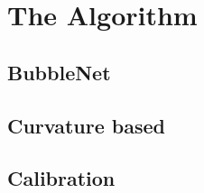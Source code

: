 \chapter{The Algorithm} \label{the_algorithm}
	\section{BubbleNet}
	\section{Curvature based}
	\section{Calibration}